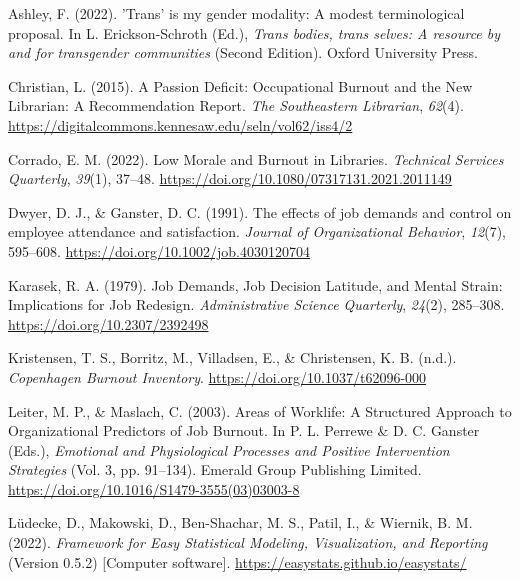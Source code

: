 \documentclass[
  twocolumn]{article}
\newlength{\cslhangindent}
\newenvironment{CSLReferences}[2] %
 {\begin{list}{}{%
  \setlength{\itemindent}{0pt}
  \setlength{\leftmargin}{0pt}
  \setlength{\parsep}{0pt}
  \ifodd #1
   \setlength{\leftmargin}{\cslhangindent}
   \setlength{\itemindent}{-1\cslhangindent}
  \fi
  \setlength{\itemsep}{#2\baselineskip}}}
 {\end{list}}
\begin{document}
\label{refs}
\begin{CSLReferences}{1}{0}
Ashley, F. (2022). '{Trans}' is my gender modality: {A} modest
terminological proposal. In L. Erickson-Schroth (Ed.), \emph{Trans
bodies, trans selves: {A} resource by and for transgender communities}
(Second Edition). {Oxford University Press}.

Christian, L. (2015). A {Passion Deficit}: {Occupational Burnout} and
the {New Librarian}: {A Recommendation Report}. \emph{The Southeastern
Librarian}, \emph{62}(4).
\url{https://digitalcommons.kennesaw.edu/seln/vol62/iss4/2}

Corrado, E. M. (2022). Low {Morale} and {Burnout} in {Libraries}.
\emph{Technical Services Quarterly}, \emph{39}(1), 37--48.
\url{https://doi.org/10.1080/07317131.2021.2011149}

Dwyer, D. J., \& Ganster, D. C. (1991). The effects of job demands and
control on employee attendance and satisfaction. \emph{Journal of
Organizational Behavior}, \emph{12}(7), 595--608.
\url{https://doi.org/10.1002/job.4030120704}

Karasek, R. A. (1979). Job {Demands}, {Job Decision Latitude}, and
{Mental Strain}: {Implications} for {Job Redesign}. \emph{Administrative
Science Quarterly}, \emph{24}(2), 285--308.
\url{https://doi.org/10.2307/2392498}

Kristensen, T. S., Borritz, M., Villadsen, E., \& Christensen, K. B.
(n.d.). \emph{Copenhagen {Burnout Inventory}}.
\url{https://doi.org/10.1037/t62096-000}

Leiter, M. P., \& Maslach, C. (2003). Areas of {Worklife}: {A Structured
Approach} to {Organizational Predictors} of {Job Burnout}. In P. L.
Perrewe \& D. C. Ganster (Eds.), \emph{Emotional and {Physiological
Processes} and {Positive Intervention Strategies}} (Vol. 3, pp.
91--134). {Emerald Group Publishing Limited}.
\url{https://doi.org/10.1016/S1479-3555(03)03003-8}

Lüdecke, D., Makowski, D., Ben-Shachar, M. S., Patil, I., \& Wiernik, B.
M. (2022). \emph{Framework for {Easy Statistical Modeling},
{Visualization}, and {Reporting}} (Version 0.5.2) {[}Computer
software{]}. \url{https://easystats.github.io/easystats/}


\end{CSLReferences}
\end{document}
